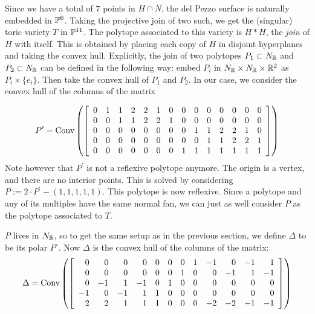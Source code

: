 \documentclass[11pt, english]{article}
\begin{document}
Since we have a total of $7$ points in $H \cap N$, the del Pezzo surface is naturally embedded in $\mathbb{P}^6$. Taking the projective join of two such, we get the (singular) toric variety $T$ in $\mathbb{P}^{11}$. The polytope associated to this variety is $H \ast H$, the \emph{join} of $H$ with itself. This is obtained by placing each copy of $H$ in disjoint hyperplanes and taking the convex hull. Explicitly, the join of two polytopes $P_1 \subset N_{\mathbb{R}}$ and $P_2 \subset N_{\mathbb{R}}$ can be defined in the following way: embed $P_i$ in $N_{\mathbb{R}} \times N_{\mathbb{R}} \times \mathbb{R}^2$ as $P_i \times \{e_i\}$. Then take the convex hull of $P_1$ and $P_2$. In our case, we consider the convex hull of the columns of the  matrix

\[
P^\prime = \Conv \left( \left[
\begin{array}{*{14}c}
0 & 1 & 1 & 2 & 2 & 1 & 0 & 0 & 0 & 0 & 0 & 0 & 0 & 0 \\
0 & 0 & 1 & 1 & 2 & 2 & 1 & 0 & 0 & 0 & 0 & 0 & 0 & 0 \\
0 & 0 & 0 & 0 & 0 & 0 & 0 & 0 & 1 & 1 & 2 & 2 & 1 & 0 \\
0 & 0 & 0 & 0 & 0 & 0 & 0 & 0 & 0 & 1 & 1 & 2 & 2 & 1 \\
0 & 0 & 0 & 0 & 0 & 0 & 0 & 1 & 1 & 1 & 1 & 1 & 1 & 1
\end{array} \right] \right)
\]
Note however that $P^\prime$ is not a reflexive polytope anymore. The origin is a vertex, and there are no interior points. This is solved by considering $P := 2 \cdot P^\prime - (1,1,1,1,1)$. This polytope is now reflexive. Since a polytope and any of its multiples have the same normal fan, we can just as well consider $P$ as the polytope associated to $T$.


$P$ lives in $N_{\mathbb{R}}$, so to get the same setup as in the previous section, we define $\Delta$ to be its polar $P^\circ$. Now $\Delta$ is the convex hull of the columns of the matrix:
\[
\Delta = \operatorname{Conv} \left(
\left[\begin{array}{rrrrrrrrrrrr}
0  & 0  & 0 & 0 & 0 & 0 &  0 & 1 & -1 & 0  & -1 & 1 \\
0  & 0  & 0 & 0 & 0 & 0 &  1 & 0 & 0  & -1 & 1  & -1 \\
0  & -1 & 1 & -1& 0 & 1 &  0 & 0 & 0  & 0  & 0  & 0 \\
-1 & 0  &-1 & 1 & 1 & 0 &  0 & 0 & 0  & 0  & 0  & 0 \\
2  & 2  & 1 & 1 & 1 & 0 &  0 & 0 & -2 & -2 & -1 & -1
\end{array}\right]\right)
\]
\end{document}
